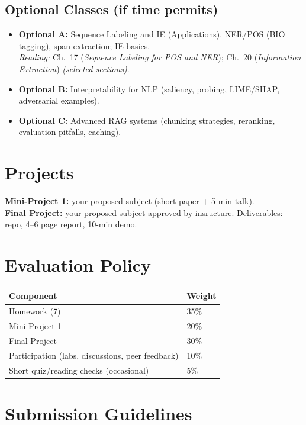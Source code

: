 \documentclass[12pt]{article}
\begin{document}
\subsection*{Optional Classes (if time permits)}
\begin{itemize}[leftmargin=1.25em]
  \item \textbf{Optional A:} Sequence Labeling and IE (Applications). NER/POS (BIO tagging), span extraction; IE basics.\\ 
  
  \emph{Reading:} Ch.\ 17 (\emph{Sequence Labeling for POS and NER}); Ch.\ 20 (\emph{Information Extraction}) \emph{(selected sections)}.
        
  \item \textbf{Optional B:} Interpretability for NLP (saliency, probing, LIME/SHAP, adversarial examples).
  \item \textbf{Optional C:} Advanced RAG systems (chunking strategies, reranking, evaluation pitfalls, caching).
\end{itemize}


\section*{Projects}
\textbf{Mini-Project 1:} your proposed subject (short paper + 5-min talk).\\
\textbf{Final Project:} your proposed subject approved by insructure. 
Deliverables: repo, 4–6 page report, 10-min demo.

\section*{Evaluation Policy}
\begin{tabular}{ll}
\textbf{Component} & \textbf{Weight} \\
\hline
Homework (7) & 35\% \\
Mini-Project 1 & 20\% \\
Final Project & 30\% \\
Participation (labs, discussions, peer feedback) & 10\% \\
Short quiz/reading checks (occasional) & 5\% \\
\end{tabular}



\section*{Submission Guidelines}
\end{document}
